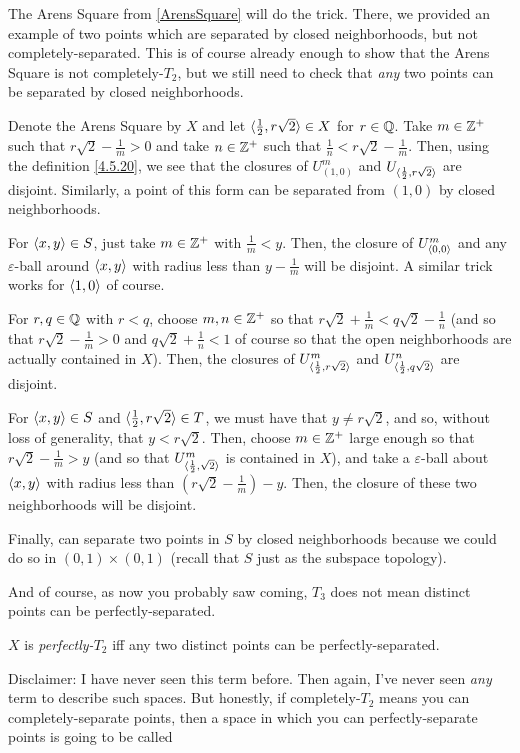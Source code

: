 \begin{exm}
The Arens Square from \cref{ArensSquare} will do the trick.  There, we provided an example of two points which are separated by closed neighborhoods, but not completely-separated.  This is of course already enough to show that the Arens Square is not completely-$T_2$, but we still need to check that \emph{any} two points can be separated by closed neighborhoods.

Denote the Arens Square by $X$ and let $\langle\frac{1}{2},r\sqrt{2}\rangle\in X$ for $r\in \mathbb{Q}$.  Take $m\in \mathbb{Z} ^+$ such that $r\sqrt{2}-\frac{1}{m}>0$ and take $n\in \mathbb{Z} ^+$ such that $\frac{1}{n}<r\sqrt{2}-\frac{1}{m}$.  Then, using the definition \eqref{4.5.20}, we see that the closures of $U_{(1,0)}^m$ and $U_{\langle\frac{1}{2},r\sqrt{2}\rangle}$ are disjoint.  Similarly, a point of this form can be separated from $(1,0)$ by closed neighborhoods.

For $\langle x,y\rangle\in S$, just take $m\in \mathbb{Z} ^+$ with $\frac{1}{m}<y$.  Then, the closure of $U_{\langle0,0\rangle}^m$ and any $\varepsilon$-ball around $\langle x,y\rangle$ with radius less than $y-\frac{1}{m}$ will be disjoint.  A similar trick works for $\langle1,0\rangle$ of course.

For $r,q\in \mathbb{Q}$ with $r<q$, choose $m,n\in \mathbb{Z} ^+$ so that $r\sqrt{2}+\frac{1}{m}<q\sqrt{2}-\frac{1}{n}$ (and so that $r\sqrt{2}-\frac{1}{m}>0$ and $q\sqrt{2}+\frac{1}{n}<1$ of course so that the open neighborhoods are actually contained in $X$).  Then, the closures of $U_{\langle\frac{1}{2},r\sqrt{2}\rangle}^m$ and $U_{\langle\frac{1}{2},q\sqrt{2}\rangle}^n$ are disjoint.

For $\langle x,y\rangle\in S$ and $\langle\frac{1}{2},r\sqrt{2}\rangle\in T$, we must have that $y\neq r\sqrt{2}$, and so, without loss of generality, that $y<r\sqrt{2}$.  Then, choose $m\in \mathbb{Z} ^+$ large enough so that $r\sqrt{2}-\frac{1}{m}>y$ (and so that $U_{\langle\frac{1}{2},\sqrt{2}\rangle}^m$ is contained in $X$), and take a $\varepsilon$-ball about $\langle x,y\rangle$ with radius less than $(r\sqrt{2}-\frac{1}{m})-y$.  Then, the closure of these two neighborhoods will be disjoint.

Finally, can separate two points in $S$ by closed neighborhoods because we could do so in $(0,1)\times (0,1)$ (recall that $S$ just as the subspace topology).
\end{exm}
And of course, as now you probably saw coming, $T_3$ does not mean distinct points can be perfectly-separated.
\begin{dfn}[Perfectly-$T_2$]\label{PerfectlyT2}
$X$ is \emph{perfectly-$T_2$} iff any two distinct points can be perfectly-separated.
\begin{rmk}
Disclaimer:  I have never seen this term before.  Then again, I've never seen \emph{any} term to describe such spaces.  But honestly, if completely-$T_2$ means you can completely-separate points, then a space in which you can perfectly-separate points is going to be called\textellipsis
\end{rmk}
\end{dfn}
